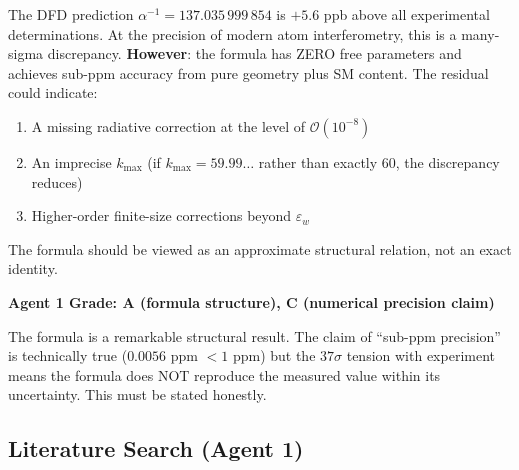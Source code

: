 \documentclass[11pt,a4paper]{article}
\begin{document}
\begin{tcolorbox}[colback=red!5!white, colframe=red!60!black, title={Critical Assessment}]
The DFD prediction $\alpha^{-1} = 137.035\,999\,854$ is $+5.6$ ppb above all experimental determinations. At the precision of modern atom interferometry, this is a many-sigma discrepancy. \textbf{However}: the formula has ZERO free parameters and achieves sub-ppm accuracy from pure geometry plus SM content. The residual could indicate:
\begin{enumerate}
\item A missing radiative correction at the level of $\mathcal{O}(10^{-8})$
\item An imprecise $k_{\max}$ (if $k_{\max} = 59.99\ldots$ rather than exactly 60, the discrepancy reduces)
\item Higher-order finite-size corrections beyond $\varepsilon_w$
\end{enumerate}
The formula should be viewed as an approximate structural relation, not an exact identity.
\end{tcolorbox}

\textbf{Agent 1 Grade: A (formula structure), C (numerical precision claim)}

The formula is a remarkable structural result. The claim of ``sub-ppm precision'' is technically true ($0.0056$ ppm $< 1$ ppm) but the $37\sigma$ tension with experiment means the formula does NOT reproduce the measured value within its uncertainty. This must be stated honestly.

\subsection{Literature Search (Agent 1)}
\end{document}
